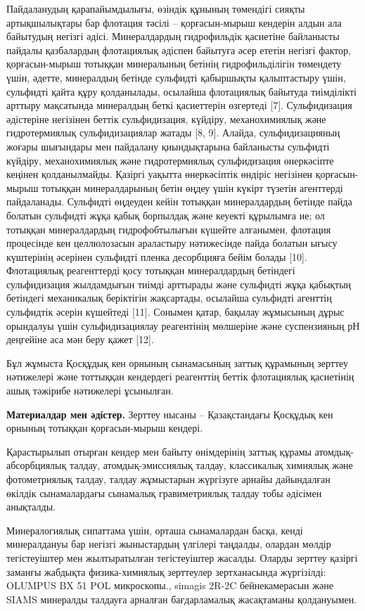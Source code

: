 {Пайдаланудың қарапайымдылығы, өзіндік құнының төмендігі сияқты
артықшылықтары бар флотация тәсілі -- қорғасын-мырыш кендерін алдын ала
байытудың негізгі әдісі. Минералдардың гидрофильдік қасиетіне байланысты
пайдалы қазбалардың флотациялық әдіспен байытуға әсер ететін негізгі
фактор, қорғасын-мырыш тотыққан минералының бетінің гидрофильділігін
төмендету үшін, әдетте, минералдың бетінде сульфидті қабыршықты
қалыптастыру үшін, сульфидті қайта құру қолданылады, осылайша
флотациялық байытуда тиімділікті арттыру мақсатында минералдың беткі
қасиеттерін өзгертеді {[}7{]}. Сульфидизация әдістеріне негізінен беттік
сульфидизация, күйдіру, механохимиялық және гидротермиялық
сульфидизациялар жатады {[}8, 9{]}. Алайда, сульфидизацияның жоғары
шығындары мен пайдалану қиындықтарына байланысты сульфидті күйдіру,
механохимиялық және гидротермиялық сульфидизация өнеркәсіпте кеңінен
қолданылмайды. Қазіргі уақытта өнеркәсіптік өндіріс негізінен
қорғасын-мырыш тотыққан минералдарының бетін өңдеу үшін күкірт түзетін
агенттерді пайдаланады. Сульфидті өңдеуден кейін тотыққан минералдардың
бетінде пайда болатын сульфидті жұқа қабық борпылдақ және кеуекті
құрылымға ие; ол тотыққан минералдардың гидрофобтылығын күшейте
алғанымен, флотация процесінде кен целлюлозасын араластыру нәтижесінде
пайда болатын ығысу күштерінің әсерінен сульфидті пленка десорбцияға
бейім болады {[}10{]}. Флотациялық реагенттерді қосу тотыққан
минералдардың бетіндегі сульфидизация жылдамдығын тиімді арттырады және
сульфидті жұқа қабықтың бетіндегі механикалық беріктігін жақсартады,
осылайша сульфидті агенттің сульфидтік әсерін күшейтеді {[}11{]}.
Сонымен қатар, бақылау жұмысының дұрыс орындалуы үшін сульфидизациялау
реагентінің мөлшеріне және суспензияның рН деңгейіне аса мән беру қажет
{[}12{]}.

Бұл жұмыста Қосқұдық кен орнының сынамасының заттық құрамының зерттеу
нәтижелері және тоттыққан кендердегі реагенттің беттік флотациялық
қасиетінің ашық тәжірибе нәтижелері ұсынылған.

{\bfseries Материалдар мен әдістер.} Зерттеу нысаны -- Қазақстандағы
Қосқұдық кен орнының тотыққан қорғасын-мырыш кендері.

Қарастырылып отырған кендер мен байыту өнімдерінің заттық құрамы
атомдық-абсорбциялық талдау, атомдық-эмиссиялық талдау, классикалық
химиялық және фотометриялық талдау, талдау жұмыстарын жүргізуге арнайы
дайындалған өкілдік сынамалардағы сынамалық гравиметриялық талдау тобы
әдісімен анықталды.

Минералогиялық сипаттама үшін, орташа сынамалардан басқа, кенді
минералдануы бар негізгі жыныстардың үлгілері таңдалды, олардан мөлдір
тегістеуіштер мен жылтыратылған тегістеуіштер жасалды. Оларды зерттеу
қазіргі заманғы жабдықта физика-химиялық зерттеулер зертханасында
жүргізілді: OLUMPUS BX 51 POL микроскопы., simagis 2R-2C бейнекамерасын
және SIAMS минералды талдауға арналған бағдарламалық жасақтаманы
қолдануымен.

}
